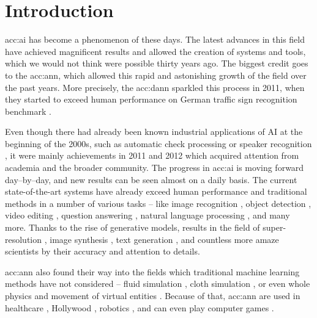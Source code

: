 \chapter{Introduction}
\label{chap:intro}

\acrfull{acc:ai} has become a phenomenon of these days. The latest advances in this field have achieved magnificent results and allowed the creation of systems and tools, which we would not think were possible thirty years ago. The biggest credit goes to the \acrfull{acc:ann}, which allowed this rapid and astonishing growth of the field over the past years. More precisely, the \acrfull{acc:dann} sparkled this process in 2011, when they started to exceed human performance on German traffic sign recognition benchmark \citep{CIRESAN2012333}.

Even though there had already been known industrial applications of AI at the beginning of the 2000s, such as automatic check processing \citep{ChecksDocumentRecognition} or speaker recognition \citep{HECK2000181}, it were mainly achievements in 2011 and 2012 which acquired attention from academia and the broader community. The progress in \acrshort{acc:ai} is moving forward day--by--day, and new results can be seen almost on a daily basis. The current state-of-the-art systems have already exceed human performance and traditional methods in a number of various tasks -- like 
image recognition \citep{pham2021meta}\citep{ZawadzkaGosk2019},
object detection \citep{ghiasi2020simple}\citep{lehner2019patch},
video editing \citep{lu2020layered},
question answering \citep{zhang2020pushing}\citep{yamada2020luke},
natural language processing \citep{gpt3},
and many more. Thanks to the rise of generative models, results in the field of
super-resolution \citep{Sun_2020}\allowbreak\citep{Chadha_2020},
image synthesis \citep{StateOfTheArtImageSythesis}\allowbreak\citep{esser2020taming}\allowbreak\citep{dalle},
text generation \citep{gpt3}\allowbreak\citep{malmi2019encode},
and countless more amaze scientists by their accuracy and attention to details.

\acrshort{acc:ann} also found their way into the fields which traditional machine learning methods have not considered -- fluid simulation \citep{um2018liquid}\citep{Kim_2019}, cloth simulation \citep{lee2019efficient}\citep{SRBO20}, or even whole physics \citep{PhysicsSimulation}\citep{sanchezgonzalez2020learning} and movement of virtual entities \citep{PhysicsBasedCharaterSImulation}\citep{zhang2020vid2player}. Because of that, \acrshort{acc:ann} are used in 
healthcare \citep{fakoor2013using}\allowbreak\citep{BreastCancerAISystem},
Hollywood \citep{aiinhollywood},
robotics \citep{pierson2017deep}\allowbreak\citep{Lee_2020},
and can even play computer games \citep{openai2019dota}\allowbreak\citep{alphastar}.

